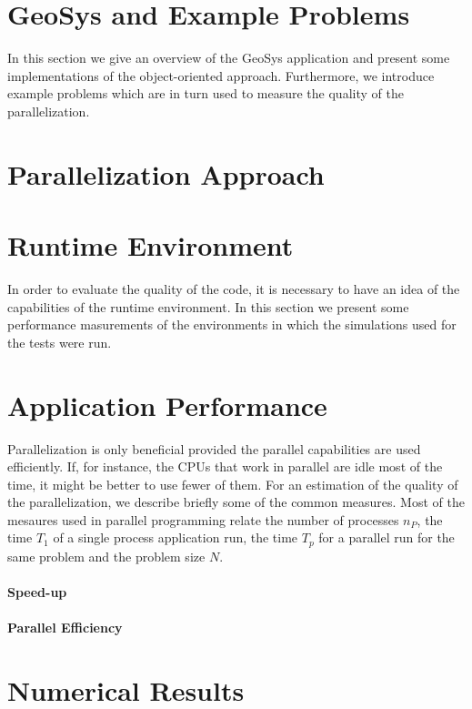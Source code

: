 \documentclass[10pt,a4paper,twocolumn]{article}
\begin{document}
\section{GeoSys and Example Problems}

In this section we give an overview of the GeoSys application and present some implementations of the object-oriented approach. Furthermore, we introduce example problems which are in turn used to measure the quality of the parallelization.


\section{Parallelization Approach}

\section{Runtime Environment}

In order to evaluate the quality of the code, it is necessary to have an idea of the capabilities of the runtime environment. In this section we present some performance masurements of the environments in which the simulations used for the tests were run. 

\section{Application Performance}

Parallelization is only beneficial provided the parallel capabilities are used efficiently. If, for instance, the CPUs that work in parallel are idle most of the time, it might be better to use fewer of them. For an estimation of the quality of the parallelization, we describe briefly some of the common measures. Most of the mesaures used in parallel programming relate the number of processes $n_P$, the time $T_1$ of a single process application run, the time $T_p$ for a parallel run for the same problem and the problem size $N$.

\paragraph{Speed-up}
\paragraph{Parallel Efficiency}


\section{Numerical Results}
\end{document}
